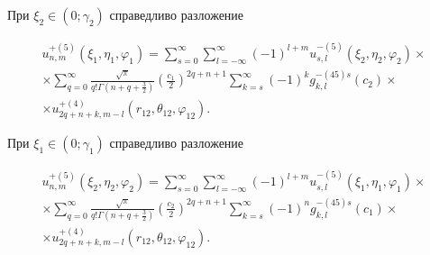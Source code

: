 %
%
%

\begin{theorem}
При ${\xi _2} \in \left( {0;{\gamma _2}} \right)$ справедливо разложение

\begin{multline}\label{eq:1:22}
u_{n,m}^{ + (5)}\left( {{\xi _1},{\eta _1},{\varphi _1}} \right) = \sum\limits_{s = 0}^\infty  {\sum\limits_{l =  - \infty }^\infty  {{{( - 1)}^{l + m}}} } u_{s,l}^{ - (5)}\left( {{\xi _2},{\eta _2},{\varphi _2}} \right) \times \\
\times \sum\limits_{q = 0}^\infty  {\frac{{\sqrt \pi  }}{{q!\Gamma \left( {n + q + \frac{3}{2}} \right)}}} {\left( {\frac{{{c_1}}}{2}} \right)^{2q + n + 1}}\sum\limits_{k = s}^\infty  {{{( - 1)}^k}} g_{k,l}^{ - (45)s}({c_2}) \times \\
\times u_{2q + n + k,m - l}^{ + (4)}\left( {{r_{12}},{\theta _{12}},{\varphi _{12}}} \right).
\end{multline}

При ${\xi _1} \in \left( {0;{\gamma _1}} \right)$ справедливо разложение

\begin{multline}\label{eq:1:23}
u_{n,m}^{ + (5)}\left( {{\xi _2},{\eta _2},{\varphi _2}} \right) = \sum\limits_{s = 0}^\infty  {\sum\limits_{l =  - \infty }^\infty  {{{( - 1)}^{l + m}}} } u_{s,l}^{ - (5)}\left( {{\xi _1},{\eta _1},{\varphi _1}} \right) \times \\
\times \sum\limits_{q = 0}^\infty  {\frac{{\sqrt \pi  }}{{q!\Gamma \left( {n + q + \frac{3}{2}} \right)}}} {\left( {\frac{{{c_2}}}{2}} \right)^{2q + n + 1}}\sum\limits_{k = s}^\infty  {{{( - 1)}^n}} g_{k,l}^{ - (45)s}({c_1}) \times \\
\times u_{2q + n + k,m - l}^{ + (4)}\left( {{r_{12}},{\theta _{12}},{\varphi _{12}}} \right).
\end{multline}


\end{theorem}

